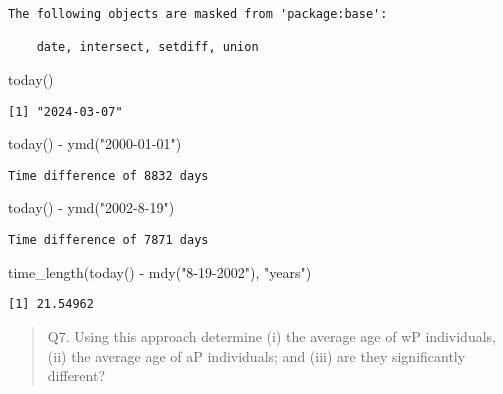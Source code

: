 \documentclass[
  letterpaper,
  DIV=11,
  numbers=noendperiod]{scrartcl}
\newenvironment{Shaded}{\begin{snugshade}}{\end{snugshade}}
\newcommand{\FunctionTok}[1]{\textcolor[rgb]{0.28,0.35,0.67}{#1}}
\newcommand{\NormalTok}[1]{\textcolor[rgb]{0.00,0.23,0.31}{#1}}
\newcommand{\SpecialCharTok}[1]{\textcolor[rgb]{0.37,0.37,0.37}{#1}}
\newcommand{\StringTok}[1]{\textcolor[rgb]{0.13,0.47,0.30}{#1}}
\begin{document}
\begin{verbatim}
The following objects are masked from 'package:base':

    date, intersect, setdiff, union
\end{verbatim}

\begin{Shaded}
\begin{Highlighting}[]
\FunctionTok{today}\NormalTok{()}
\end{Highlighting}
\end{Shaded}

\begin{verbatim}
[1] "2024-03-07"
\end{verbatim}

\begin{Shaded}
\begin{Highlighting}[]
\FunctionTok{today}\NormalTok{() }\SpecialCharTok{{-}} \FunctionTok{ymd}\NormalTok{(}\StringTok{"2000{-}01{-}01"}\NormalTok{)}
\end{Highlighting}
\end{Shaded}

\begin{verbatim}
Time difference of 8832 days
\end{verbatim}

\begin{Shaded}
\begin{Highlighting}[]
\FunctionTok{today}\NormalTok{() }\SpecialCharTok{{-}} \FunctionTok{ymd}\NormalTok{(}\StringTok{"2002{-}8{-}19"}\NormalTok{)}
\end{Highlighting}
\end{Shaded}

\begin{verbatim}
Time difference of 7871 days
\end{verbatim}

\begin{Shaded}
\begin{Highlighting}[]
\FunctionTok{time\_length}\NormalTok{(}\FunctionTok{today}\NormalTok{() }\SpecialCharTok{{-}} \FunctionTok{mdy}\NormalTok{(}\StringTok{"8{-}19{-}2002"}\NormalTok{), }\StringTok{"years"}\NormalTok{)}
\end{Highlighting}
\end{Shaded}

\begin{verbatim}
[1] 21.54962
\end{verbatim}

\begin{quote}
Q7. Using this approach determine (i) the average age of wP individuals,
(ii) the average age of aP individuals; and (iii) are they significantly
different?
\end{quote}
\end{document}
